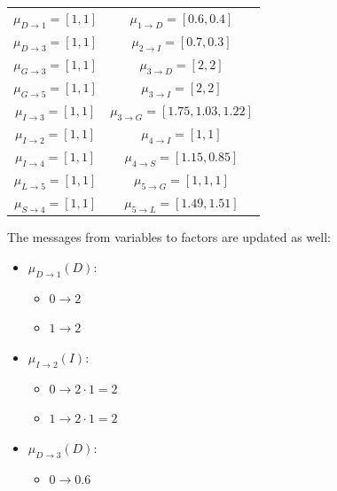 \begin{example}
\begin{itemize}
\begin{itemize}
            \end{itemize}
    \end{itemize}
    \begin{table}[H]
        \centering
        \begin{tabular}{|cc|}
        \hline
        $\mu_{D \rightarrow 1}=[1,1]$ & $\mu_{1 \rightarrow D}=[0.6,0.4]$   \\
        $\mu_{D \rightarrow 3}=[1,1]$ & $\mu_{2 \rightarrow I}=[0.7,0.3]$   \\
        $\mu_{G \rightarrow 3}=[1,1]$ & $\mu_{3 \rightarrow D}=[2,2]$   \\
        $\mu_{G \rightarrow 5}=[1,1]$ & $\mu_{3 \rightarrow I}=[2,2]$   \\
        $\mu_{I \rightarrow 3}=[1,1]$ & $\mu_{3 \rightarrow G}=[1.75,1.03,1.22]$ \\
        $\mu_{I \rightarrow 2}=[1,1]$ & $\mu_{4 \rightarrow I}=[1,1]$   \\
        $\mu_{I \rightarrow 4}=[1,1]$ & $\mu_{4 \rightarrow S}=[1.15,0.85]$   \\
        $\mu_{L \rightarrow 5}=[1,1]$ & $\mu_{5 \rightarrow G}=[1,1,1]$ \\
        $\mu_{S \rightarrow 4}=[1,1]$ & $\mu_{5 \rightarrow L}=[1.49,1.51]$   \\ \hline
        \end{tabular}
    \end{table}
    The messages from variables to factors are updated as well:
    \begin{itemize}
        \item $\mu_{D \rightarrow 1}(D)$:
            \begin{itemize}
                \item $0 \rightarrow 2$
                \item $1 \rightarrow 2$
            \end{itemize}
        \item $\mu_{I \rightarrow 2}(I)$:
            \begin{itemize}
                \item $0 \rightarrow 2 \cdot 1 = 2$
                \item $1 \rightarrow 2 \cdot 1 = 2$
            \end{itemize}
        \item $\mu_{D \rightarrow 3}(D)$:
            \begin{itemize}
                \item $0 \rightarrow 0.6$

\end{itemize}
\end{itemize}
\end{example}
